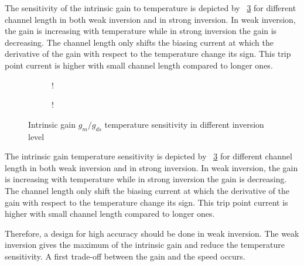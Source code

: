The sensitivity of the intrinsic gain to temperature is depicted by \figurename~\ref{fig:sAv_nel} for different channel length in both weak inversion and in strong inversion. In weak inversion, the gain is increasing with temperature while in strong inversion the gain is decreasing. The channel length only shifts the biasing current at which the derivative of the gain with respect to the temperature change its sign. This trip point current is higher with small channel length compared to longer ones.
\begin{figure}[!ht]
	\centering
	\begin{subfigure}[b]{0.48\textwidth}
		\resizebox {\textwidth} {!} { 
			
		}
		\label{fig:Av_nel_sensitivity_wi}
	\end{subfigure}
	\begin{subfigure}[b]{0.48\textwidth}
		\resizebox {\textwidth} {!} { 
			
		}
		\label{fig:Av_nel_sensitivity_si}
	\end{subfigure}
	\caption{Intrinsic gain \(g_m/g_{ds} \) temperature sensitivity in different inversion level}
	\label{fig:sAv_nel}
\end{figure}

The intrinsic gain temperature sensitivity is depicted by \figurename~\ref{fig:sAv_nel} for different channel length in both weak inversion and in strong inversion. In weak inversion, the gain is increasing with temperature while in strong inversion the gain is decreasing. The channel length only shift the biasing current at which the derivative of the gain with respect to the temperature change its sign. This trip point current is higher with small channel length compared to longer ones.

Therefore, a design for high accuracy should be done in weak inversion. The weak inversion gives the maximum of the intrinsic gain and reduce the temperature sensitivity. A first trade-off between the gain and the speed occurs.

